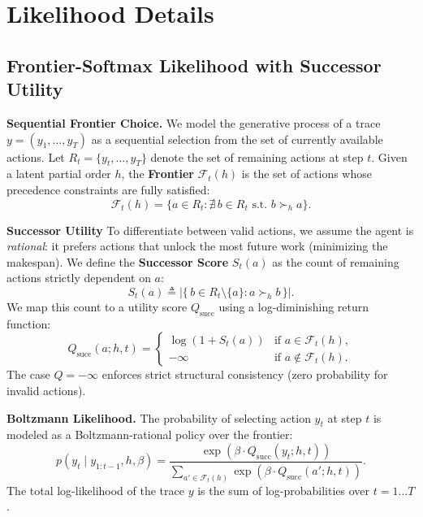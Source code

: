 \documentclass{article}
\theoremstyle{plain}
\theoremstyle{definition}
\theoremstyle{remark}
\begin{document}
\section{Likelihood Details}
\label{app:model-details}

\subsection{Frontier-Softmax Likelihood with Successor Utility}
\label{app:qscore-details}

\noindent \textbf{Sequential Frontier Choice.}
We model the generative process of a trace $y=(y_1,\dots,y_T)$ as a sequential selection from the set of currently available actions. Let $R_t=\{y_t,\dots,y_T\}$ denote the set of remaining actions at step $t$. Given a latent partial order $h$, the \textbf{Frontier} $\mathcal{F}_t(h)$ is the set of actions whose precedence constraints are fully satisfied:
\[
\mathcal{F}_t(h) = \{a \in R_t : \nexists\, b \in R_t \text{ s.t. } b \succ_h a\}.
\]

\noindent \textbf{Successor Utility}
To differentiate between valid actions, we assume the agent is \emph{rational}: it prefers actions that unlock the most future work (minimizing the makespan). We define the \textbf{Successor Score} $S_t(a)$ as the count of remaining actions strictly dependent on $a$:
\[
    S_t(a) \triangleq \left|\{\,b\in R_t\setminus\{a\}: a \succ_{h} b\,\}\right|.
\]
We map this count to a utility score $Q_{\text{succ}}$ using a log-diminishing return function:
\begin{equation}
    Q_{\text{succ}}(a; h, t) = 
    \begin{cases} 
        \log(1 + S_t(a)) & \text{if } a \in \mathcal{F}_t(h), \\
        -\infty & \text{if } a \notin \mathcal{F}_t(h).
    \end{cases}
\end{equation}
The case $Q=-\infty$ enforces strict structural consistency (zero probability for invalid actions).

\noindent \textbf{Boltzmann Likelihood.}
The probability of selecting action $y_t$ at step $t$ is modeled as a Boltzmann-rational policy over the frontier:
\begin{equation}
    p(y_t \mid y_{1:t-1}, h, \beta) = \frac{\exp(\beta \cdot Q_{\text{succ}}(y_t; h, t))}{\sum_{a' \in \mathcal{F}_t(h)} \exp(\beta \cdot Q_{\text{succ}}(a'; h, t))}.
    \label{eq:app-boltzmann}
\end{equation}
The total log-likelihood of the trace $y$ is the sum of log-probabilities over $t=1 \dots T$.
\end{document}
